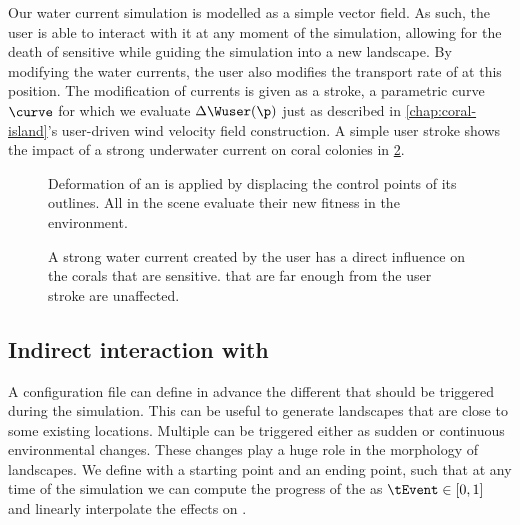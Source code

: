 Our water current simulation is modelled as a simple vector field. As such, the user is able to interact with it at any moment of the simulation, allowing for the death of sensitive  while guiding the simulation into a new landscape. By modifying the water currents, the user also modifies the transport rate of  at this position. The modification of currents is given as a stroke, a parametric curve $\curve$ for which we evaluate $\Delta \Wuser(\p)$ just as described in \cref{chap:coral-island}'s user-driven wind velocity field construction. A simple user stroke shows the impact of a strong underwater current on coral colonies in \cref{fig:env-obj-user-flow-effects}.

\begin{figure}
    \caption{Deformation of an  is applied by displacing the control points of its outlines. All  in the scene evaluate their new fitness in the environment.}
    \label{fig:env-obj-island-deformation}
\end{figure}

\begin{figure}
    \caption{A strong water current created by the user has a direct influence on the corals that are sensitive.  that are far enough from the user stroke are unaffected.}
    \label{fig:env-obj-user-flow-effects}
\end{figure}

\subsection{Indirect interaction with }
\label{sec:env-obj-events}
A configuration file can define in advance the different  that should be triggered during the simulation. This can be useful to generate landscapes that are close to some existing locations.
Multiple  can be triggered either as sudden or continuous environmental changes. These changes play a huge role in the morphology of landscapes.
We define  with a starting point and an ending point, such that at any time of the simulation we can compute the progress of the  as $\tEvent \in [0, 1]$ and linearly interpolate the effects on .

